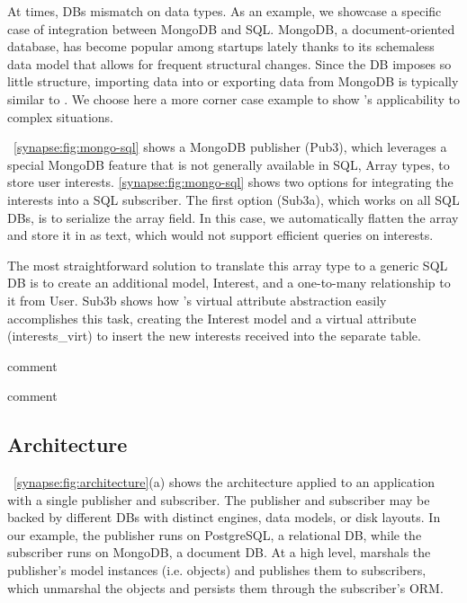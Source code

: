 At times, DBs mismatch on data types.  As an example, we showcase a specific
case of integration between MongoDB and SQL.
MongoDB, a document-oriented database, has become popular among startups
lately thanks to its schemaless data model that allows for frequent
structural changes.  Since the DB imposes so little structure, importing data
into or exporting data from MongoDB is typically similar to
\label{synapse:fig:mongo-to-star}. We choose here a more corner case example to
show \synapse's applicability to complex situations.

\F~\ref{synapse:fig:mongo-sql} shows a MongoDB publisher (Pub3), which leverages a
special MongoDB feature that is not generally available in SQL,
Array types, to store user interests.  \F\ref{synapse:fig:mongo-sql} shows two options
for integrating the interests into a SQL subscriber.  The first option (Sub3a),
which works on all SQL DBs, is to serialize the array field.
In this case, we automatically flatten the array and store it in as text, which would not support efficient queries on interests.

The most straightforward solution to translate this array type to a generic SQL DB is to create an additional model, {\code \footnotesize Interest}, and a one-to-many relationship to it from {\code \footnotesize User}.
Sub3b shows how \synapse's virtual attribute abstraction easily accomplishes
this task, creating the {\code \footnotesize Interest} model and a virtual
attribute  ({\code \footnotesize interests\_virt}) to insert the new interests
received into the separate table.

   comment

   comment
\subsection{\synapse Architecture}
\label{synapse:sec:arch}

\F~\ref{synapse:fig:architecture}(a) shows the \synapse architecture applied to an
application with a single publisher and subscriber. The publisher and subscriber
may be backed by different DBs with distinct engines, data models, or disk
layouts. In our example, the publisher runs on PostgreSQL, a relational DB,
while the subscriber runs on MongoDB, a document DB. At a high level, \synapse
marshals the publisher's model instances (i.e. objects) and publishes them to
subscribers, which unmarshal the objects and persists them through the
subscriber's ORM.

